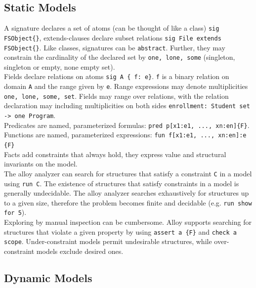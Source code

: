 \subsection{Static Models}

A signature declares a set of atoms (can be thought of like a class) \texttt{sig FSObject\{\}}, extends-clauses declare subset relations \texttt{sig File extends FSObject\{\}}. Like classes, signatures can be \texttt{abstract}. Further, they may constrain the cardinality of the declared set by \texttt{one, lone, some} (singleton, singleton or empty, none empty set). \\

Fields declare relations on atoms \texttt{sig A \{ f: e\}}. \texttt{f} is a binary relation on domain \texttt{A} and the range given by \texttt{e}. Range expressions may denote multiplicities \texttt{one, lone, some, set}. Fields may range over relations, with the relation declaration may including multiplicities on both sides \texttt{enrollment: Student set -> one Program}. \\

Predicates are named, parameterized formulas: \texttt{pred p[x1:e1, ..., xn:en]\{F\}}.\\

Functions are named, parameterized expressions: \texttt{fun f[x1:e1, ..., xn:en]:e \{F\}}\\

Facts add constraints that always hold, they express value and structural invariants on the model. \\

The alloy analyzer can search for structures that satisfy a constraint \texttt{C} in a model using \texttt{run C}. The existence of structures that satisfy constraints in a model is generally undecidable. The alloy analyzer searches exhaustively for structures up to a given size, therefore the problem becomes finite and decidable (e.g. \texttt{run show for 5}).\\

Exploring by manual inspection can be cumbersome. Alloy supports searching for structures that violate a given property by using \texttt{assert a \{F\}} and \texttt{check a scope}. Under-constraint models permit undesirable structures, while over-constraint models exclude desired ones.


\subsection{Dynamic Models}

